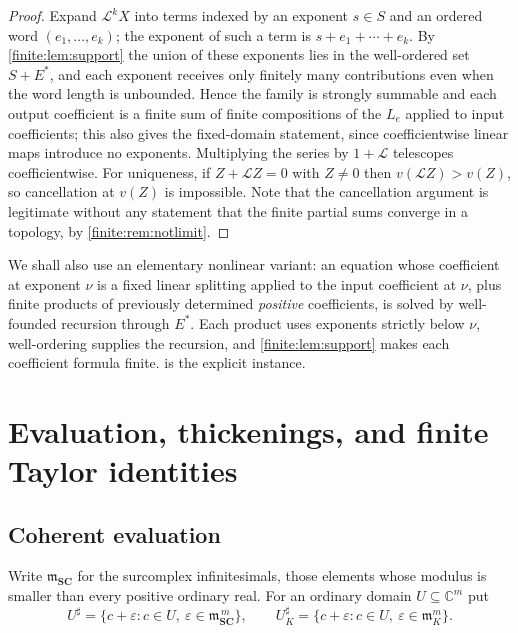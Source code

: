 \documentclass[11pt,letterpaper]{article}
\theoremstyle{definition}
\theoremstyle{remark}
\newcommand{\SC}{\mathbf{SC}}
\newcommand{\C}{\mathbb C}
\newcommand{\mm}{\mathfrak m}
\newcommand{\sh}{^{\sharp}}
\numberwithin{equation}{section}
\begin{document}
\begin{proof}
Expand $\mathcal L^kX$ into terms indexed by an exponent $s\in S$ and an ordered word $(e_1,\ldots,e_k)$; the exponent of such a term is $s+e_1+\cdots+e_k$. By \cref{finite:lem:support} the union of these exponents lies in the well-ordered set $S+E^*$, and each exponent receives only finitely many contributions even when the word length is unbounded. Hence the family is strongly summable and each output coefficient is a finite sum of finite compositions of the $L_e$ applied to input coefficients; this also gives the fixed-domain statement, since coefficientwise linear maps introduce no exponents. Multiplying the series by $1+\mathcal L$ telescopes coefficientwise. For uniqueness, if $Z+\mathcal LZ=0$ with $Z\neq0$ then $v(\mathcal LZ)>v(Z)$, so cancellation at $v(Z)$ is impossible. Note that the cancellation argument is legitimate without any statement that the finite partial sums converge in a topology, by \cref{finite:rem:notlimit}.
\end{proof}

We shall also use an elementary nonlinear variant: an equation whose coefficient at exponent $\nu$ is a fixed linear splitting applied to the input coefficient at $\nu$, plus finite products of previously determined \emph{positive} coefficients, is solved by well-founded recursion through $E^*$. Each product uses exponents strictly below $\nu$, well-ordering supplies the recursion, and \cref{finite:lem:support} makes each coefficient formula finite.  is the explicit instance.

\section{Evaluation, thickenings, and finite Taylor identities}
\label{finite:sec:evaluation}

\subsection{Coherent evaluation}
\label{finite:sec:coherenteval}

Write $\mm_{\SC}$ for the surcomplex infinitesimals, those elements whose modulus is smaller than every positive ordinary real. For an ordinary domain $U\subseteq\C^m$ put
\[
 U\sh=\{c+\varepsilon:c\in U,\ \varepsilon\in\mm_{\SC}^{\,m}\},
 \qquad
 U\sh_K=\{c+\varepsilon:c\in U,\ \varepsilon\in\mm_K^m\}.
\]
\end{document}
